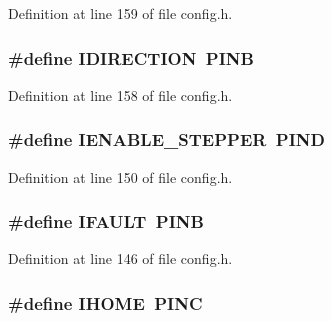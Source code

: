 Definition at line 159 of file config.\-h.

\hypertarget{group__biba__config_ga05466c17e001989bf527098e9ea8b20c}{
\subsubsection[{I\-D\-I\-R\-E\-C\-T\-I\-O\-N}]{\setlength{\rightskip}{0pt plus 5cm}\#define I\-D\-I\-R\-E\-C\-T\-I\-O\-N~P\-I\-N\-B}}\label{group__biba__config_ga05466c17e001989bf527098e9ea8b20c}


Definition at line 158 of file config.\-h.

\hypertarget{group__biba__config_ga38a64ed512258be4847202d41c945f1d}{
\subsubsection[{I\-E\-N\-A\-B\-L\-E\-\_\-\-S\-T\-E\-P\-P\-E\-R}]{\setlength{\rightskip}{0pt plus 5cm}\#define I\-E\-N\-A\-B\-L\-E\-\_\-\-S\-T\-E\-P\-P\-E\-R~P\-I\-N\-D}}\label{group__biba__config_ga38a64ed512258be4847202d41c945f1d}


Definition at line 150 of file config.\-h.

\hypertarget{group__biba__config_gaeddf690491247a8a3a624d3e52904fe7}{
\subsubsection[{I\-F\-A\-U\-L\-T}]{\setlength{\rightskip}{0pt plus 5cm}\#define I\-F\-A\-U\-L\-T~P\-I\-N\-B}}\label{group__biba__config_gaeddf690491247a8a3a624d3e52904fe7}


Definition at line 146 of file config.\-h.

\hypertarget{group__biba__config_gabd13263a1daa3de2c2e1417449c8e476}{
\subsubsection[{I\-H\-O\-M\-E}]{\setlength{\rightskip}{0pt plus 5cm}\#define I\-H\-O\-M\-E~P\-I\-N\-C}}\label{group__biba__config_gabd13263a1daa3de2c2e1417449c8e476}


